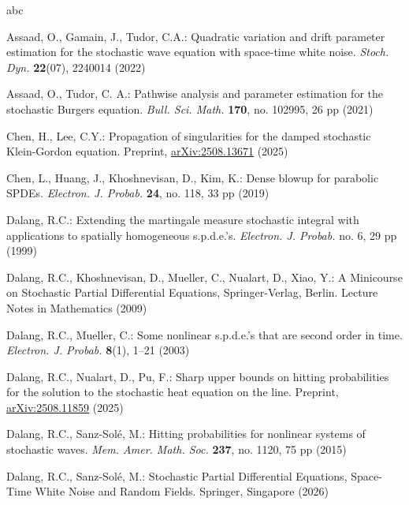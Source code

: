 \documentclass[11pt,reqno]{amsart}
\numberwithin{equation}{section}
\newcommand{\1}{{\bf 1}}
\newcommand{\2}{{\bf 2}}
\begin{document}
           
                     
                     
       \vskip0.5cm
 
\begin{thebibliography}{abc}
 
Assaad, O., Gamain, J., Tudor, C.A.: Quadratic variation and drift parameter estimation for the stochastic wave equation with space-time white noise. 
\textit{Stoch. Dyn.} \textbf{22}(07), 2240014 (2022)

 
Assaad, O.,   Tudor, C. A.: Pathwise analysis and parameter estimation for the stochastic Burgers equation. \textit{Bull. Sci. Math.} {\bf 170}, no. 102995, 26 pp (2021)
 
Chen, H.,   Lee, C.Y.:   Propagation of singularities for the damped stochastic Klein-Gordon equation. Preprint, \href{https://doi.org/10.48550/arXiv.2508.13671} {arXiv:2508.13671} (2025)

Chen, L., Huang, J., Khoshnevisan, D., Kim, K.: Dense blowup for parabolic SPDEs. 
\textit{Electron. J. Probab.} \textbf{24},  no. 118, 33 pp  (2019)

Dalang, R.C.: Extending the martingale measure stochastic integral with applications to spatially homogeneous s.p.d.e.'s. 
\textit{Electron. J. Probab.}  no. 6, 29 pp (1999)
  
Dalang, R.C., Khoshnevisan, D., Mueller, C., Nualart, D., Xiao, Y.: A Minicourse on Stochastic Partial Differential Equations, Springer-Verlag, Berlin. Lecture Notes in Mathematics  (2009)

   Dalang,  R.C.,  Mueller,  C.:
Some nonlinear s.p.d.e.'s that are second order in time.
{\it Electron. J. Probab.} {\bf 8}(1),   1--21 (2003)
 
 
Dalang, R.C., Nualart, D., Pu, F.: Sharp upper bounds on hitting probabilities for the solution to the stochastic heat equation on the line. Preprint, \href{https://doi.org/10.48550/arXiv.2508.11859}{arXiv:2508.11859} (2025)
 

Dalang, R.C., Sanz-Sol\'e, M.: Hitting probabilities for nonlinear systems of stochastic waves. 
\textit{Mem. Amer. Math. Soc.} \textbf{237}, no. 1120, 75 pp (2015)
 

Dalang, R.C., Sanz-Sol\'e, M.:
Stochastic Partial Differential Equations, Space-Time White Noise and Random Fields.   Springer, Singapore  (2026) 



\end{thebibliography}
\end{document}

